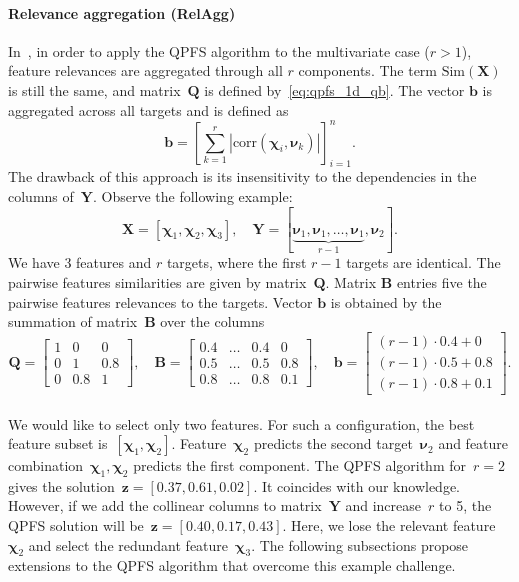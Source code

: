 \documentclass[preprint,authoryear,12pt]{elsarticle}
\theoremstyle{definition}
\newcommand{\bz}{\mathbf{z}}
\newcommand{\bb}{\mathbf{b}}
\newcommand{\bY}{\mathbf{Y}}
\newcommand{\bX}{\mathbf{X}}
\newcommand{\bB}{\mathbf{B}}
\newcommand{\bQ}{\mathbf{Q}}
\newcommand{\bchi}{\boldsymbol{\chi}}
\newcommand{\bnu}{\boldsymbol{\nu}}
\begin{document}
\paragraph{Relevance aggregation (RelAgg)}

In~\citep{motrenko2018multi}, in order to apply the QPFS algorithm to the multivariate case ($r > 1$), feature relevances are aggregated through all $r$ components. The term $\text{Sim}(\bX)$ is still the same, and matrix~$\bQ$ is defined by~\eqref{eq:qpfs_1d_qb}. The vector $\bb$ is aggregated across all targets and is defined as
\begin{equation*}
\bb = \left[\sum_{k=1}^r|\text{corr}(\bchi_i, \bnu_k)|\right]_{i=1}^n.
\end{equation*}
The drawback of this approach is its insensitivity to the dependencies in the columns of~$\bY$. Observe the following example:
\begin{equation*}
\bX = [\bchi_1, \bchi_2, \bchi_3], \quad \bY = [\underbrace{\bnu_1, \bnu_1, \dots, \bnu_1}_{r-1}, \bnu_2].
\end{equation*}
We have 3 features and $r$ targets, where the first $r-1$ targets are identical.
The pairwise features similarities are given by matrix~$\bQ$.
Matrix $\bB$ entries five the pairwise features relevances to the targets.
Vector $\bb$ is obtained by the summation of matrix~$\bB$ over the columns
\begin{equation}
\bQ = \begin{bmatrix} 1 & 0 & 0\\ 0 & 1 & 0.8 \\ 0 & 0.8 & 1 \end{bmatrix}, \quad
\bB = \begin{bmatrix} 0.4 & \dots & 0.4 & 0 \\ 0.5 & \dots & 0.5 & 0.8 \\ 0.8 & \dots & 0.8 & 0.1 \end{bmatrix}, \quad
\bb = \begin{bmatrix} (r-1) \cdot 0.4 + 0 \\ (r-1) \cdot 0.5 + 0.8 \\ (r-1) \cdot 0.8 + 0.1 \end{bmatrix}.
\label{eq:qpfs_example}
\end{equation}
\vspace{0.5cm} \\
We would like to select only two features.
For such a configuration, the best feature subset is~$[\bchi_1, \bchi_2]$.
Feature~$\bchi_2$ predicts the second target~$\bnu_2$ and feature combination~$\bchi_1, \bchi_2$ predicts the first component.
The QPFS algorithm for~$r=2$ gives the solution~$\bz = [0.37,	0.61,	0.02]$. It coincides with our knowledge.
However, if we add the collinear columns to matrix~$\bY$ and increase~$r$ to 5, the QPFS solution will be~$\bz = [0.40,	0.17, 0.43]$.
Here, we lose the relevant feature~$\bchi_2$ and select the redundant feature~$\bchi_3$.
The following subsections propose extensions to the QPFS algorithm that overcome this example challenge.
\end{document}

